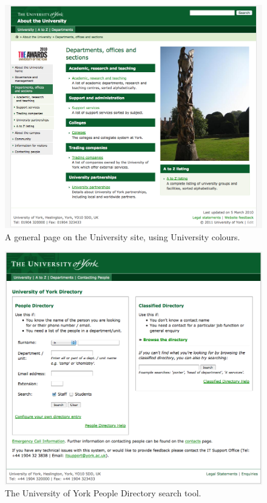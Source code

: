 \documentclass[]{scrartcl}
\begin{document}
\begin{figure}
  \begin{center}
    \includegraphics[width=160mm]{images/2011_11_06_yorkacuk.png}
  \end{center}
  \caption{A general page on the University site, using University colours.}
  \label{yorkacuk_general_page}
\end{figure}

\begin{figure}
  \begin{center}
    \includegraphics[width=160mm]{images/2011_11_06_yorkacuk_directory.png}
  \end{center}
  \caption{The University of York People Directory search tool.}
  \label{yorkacuk_directory_search}
\end{figure}
\end{document}
